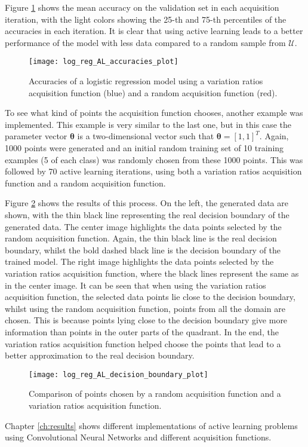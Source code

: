 Figure \ref{fig:log_reg_AL_accuracies_plot} shows the mean accuracy on the validation set in each acquisition iteration, with the light colors showing the 25-th and 75-th percentiles of the accuracies in each iteration. It is clear that using active learning leads to a better performance of the model with less data compared to a random sample from $\mathcal{U}$.

\begin{figure}[H]
    \centering
    \texttt{[image: log\_reg\_AL\_accuracies\_plot]}
    \caption{Accuracies of a logistic regression model using a variation ratios acquisition function (blue) and a random acquisition function (red).}
    \label{fig:log_reg_AL_accuracies_plot}
\end{figure}

To see what kind of points the acquisition function chooses, another example was implemented. This example is very similar to the last one, but in this case the parameter vector $\boldsymbol{\theta}$ is a two-dimensional vector such that $\boldsymbol{\theta} = \left[ 1, 1 \right]^T$. Again, 1000 points were generated and an initial random training set of 10 training examples (5 of each class) was randomly chosen from these 1000 points. This was followed by 70 active learning iterations, using both a variation ratios acquisition function and a random acquisition function.

Figure \ref{fig:log_reg_AL_decision_boundary_plot} shows the results of this process. On the left, the generated data are shown, with the thin black line representing the real decision boundary of the generated data. The center image highlights the data points selected by the random acquisition function. Again, the thin black line is the real decision boundary, whilst the bold dashed black line is the decision boundary of the trained model. The right image highlights the data points selected by the variation ratios acquisition function, where the black lines represent the same as in the center image. It can be seen that when using the variation ratios acquisition function, the selected data points lie close to the decision boundary, whilst using the random acquisition function, points from all the domain are chosen. This is because points lying close to the decision boundary give more information than points in the outer parts of the quadrant. In the end, the variation ratios acquisition function helped choose the points that lead to a better approximation to the real decision boundary.

\begin{figure}[H]
    \centering
    \texttt{[image: log\_reg\_AL\_decision\_boundary\_plot]}
    \caption{Comparison of points chosen by a random acquisition function and a variation ratios acquisition function.}
    \label{fig:log_reg_AL_decision_boundary_plot}
\end{figure}

Chapter \ref{ch:results} shows different implementations of active learning problems using Convolutional Neural Networks and different acquisition functions.
